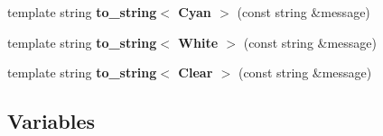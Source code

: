 \begin{DoxyCompactItemize}
\mbox{\label{namespace_g_a_1_1color_a52355e6276e8691964a5a070606b001f}} 
template string {\bfseries to\+\_\+string$<$ Cyan $>$} (const string \&message)
\item 
\mbox{\label{namespace_g_a_1_1color_ac9189839a1cb7e83eef2bb25be7b05f6}} 
template string {\bfseries to\+\_\+string$<$ White $>$} (const string \&message)
\item 
\mbox{\label{namespace_g_a_1_1color_abf46f0d0a1ba3d606e41141334c44ae9}} 
template string {\bfseries to\+\_\+string$<$ Clear $>$} (const string \&message)
\end{DoxyCompactItemize}
\subsection*{Variables}
